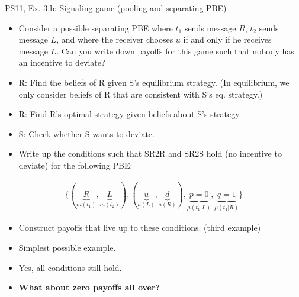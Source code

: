 \begin{frame}{PS11, Ex. 3.b: Signaling game (pooling and separating PBE)}
    \begin{itemize}
        \item[(b)] Consider a possible separating PBE where $t_1$ sends message $R$, $t_2$ sends message $L$, and where the receiver chooses $u$ if and only if he receives message $L$. Can you write down payoffs for this game such that nobody has an incentive to deviate?
    \end{itemize} \vspace{-8pt}
    \begin{multicols}{2}
      \begin{itemize}
        \item[SR3:] R: Find the beliefs of R given S's equilibrium strategy. (In equilibrium, we only consider beliefs of R that are consistent with S's eq. strategy.)
        \item[SR2R:] R: Find R's optimal strategy given beliefs about S's strategy.
        \item[SR2S:] S: Check whether S wants to deviate.
        \item[PBE:]  Write up the conditions such that SR2R and SR2S hold (no incentive to deviate) for the following PBE:
      \end{itemize}\vspace{-16pt}
      \begin{align*}
        \{(\underbrace{R}_{m(t_1)},\underbrace{L}_{m(t_2)}),(\underbrace{u}_{a(L)},\underbrace{d}_{a(R)}),\underbrace{p=0}_{\mu(t_1|L)},\underbrace{q=1}_{\mu(t_1|R)}\}
      \end{align*}\vspace{-17pt}
      \begin{itemize}
        \item[$\rightarrow$] Construct payoffs that live up to these conditions. (third example)
        \item[i:] \vspace{-1pt}Simplest possible example.
        \item[ii:] \vspace{-1pt}Yes, all conditions still hold.
        \item[iii:] \vspace{-1pt}\textbf{What about zero payoffs all over?}
      \end{itemize}
      \vfill\null\columnbreak
      \begin{figure}[!h]
        \center{}

\end{figure}
\end{multicols}
\end{frame}
